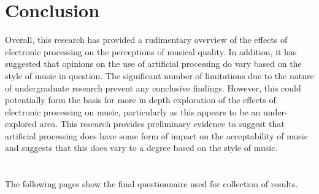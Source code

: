 \documentclass[titlepage]{scrartcl}
\begin{document}
    \section{Conclusion}
    Overall, this research has provided a rudimentary overview of the effects
    of electronic processing on the perceptions of musical quality. In
    addition, it has suggested that opinions on the use of artificial
    processing do vary based on the style of music in question. The significant
    number of limitations due to the nature of undergraduate research prevent
    any conclusive findings. However, this could potentially form the basis for
    more in depth exploration of the effects of electronic processing on music,
    particularly as this appears to be an under-explored area.
    This research provides preliminary evidence to suggest that artificial
    processing does have some form of impact on the acceptability of music and
    suggests that this does vary to a degree based on the style of music.
    
    \printbibliography

    \appendix
    \gdef\thesection{\centerline{Appendix \Alph{section}}}
    \section{}
    The following pages show the final questionnaire used for collection of results. 
    
\end{document}
